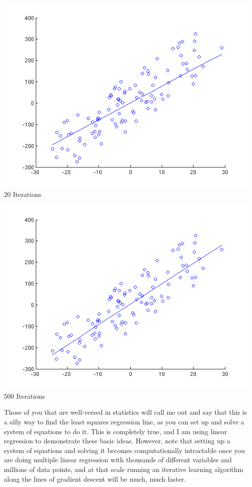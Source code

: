 \documentclass[a4paper]{article}
\begin{document}
\begin{center}
    \includegraphics[scale=0.5]{images/20.png}\\
    20 Iterations
\end{center}

\begin{center}
    \includegraphics[scale=0.5]{images/500.png}\\
    500 Iterations
\end{center}

Those of you that are well-versed in statistics will call me out and say that this is a silly way to
find the least squares regression line, as you can set up and solve a system of equations to do it.
This is completely true, and I am using linear regression to demonstrate these basic ideas. However,
note that setting up a system of equations and solving it becomes computationally intractable once
you are doing multiple linear regression with thousands of different variables and millions of data
points, and at that scale running an iterative learning algorithm along the lines of gradient
descent will be much, much faster.
\end{document}

